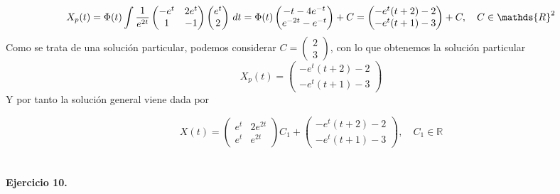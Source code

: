 \documentclass[fleqn]{article}
\def\R{\mathds{R}}
\begin{document}
    $$X_p(t) = \Phi(t) \int 
    \frac{1}{e^{2t}}
    \begin{pmatrix}
        -e^t & 2e^t\\
        1 & -1
    \end{pmatrix}
    \begin{pmatrix}
        e^t \\ 2
    \end{pmatrix}
    \thinspace dt = \Phi(t)
    \begin{pmatrix}
        -t - 4e^{-t}\\
        e^{-2t} - e^{-t}
    \end{pmatrix}
    +C = 
    \begin{pmatrix}
        -e^t(t+2) -2\\
        -e^t(t+1) -3
    \end{pmatrix}
    +C, \quad C \in \R^2
    $$
    Como se trata de una solución particular, podemos considerar $C=\begin{pmatrix} 2 \\ 3\end{pmatrix}$, con lo que obtenemos la solución particular
    $$X_p(t)=
    \begin{pmatrix}
        -e^t(t+2) -2\\
        -e^t(t+1) -3
    \end{pmatrix}$$
    Y por tanto la solución general viene dada por 

    $$X(t)= 
    \begin{pmatrix}
        e^t & 2e^{2t}\\
        e^t & e^{2t}
    \end{pmatrix}
    C_1 + 
    \begin{pmatrix}
        -e^t(t+2) -2\\
        -e^t(t+1) -3
    \end{pmatrix}, \quad C_1\in\R
    $$\\ \\

    \textbf{Ejercicio 10. } \\
\end{document}
